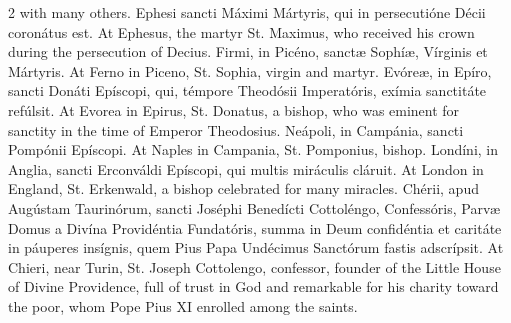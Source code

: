 \begin{paracol}{2}
 with many others.
\switchcolumn*
{}
Ephesi sancti Máximi 
 Mártyris, qui in persecutióne Décii coronátus est.
\switchcolumn
{}
At Ephesus, the martyr St. Maximus, 
 who received his crown during the persecution of Decius.
\switchcolumn*
{}
Firmi, in Picéno, 
 sanctæ Sophíæ, Vírginis et Mártyris.
\switchcolumn
{}
At Ferno in Piceno, St. Sophia, 
 virgin and martyr.
\switchcolumn*
{}
Evóreæ, in Epíro, 
 sancti Donáti Epíscopi, qui, témpore Theodósii Imperatóris, exímia 
 sanctitáte refúlsit.
\switchcolumn
{}
At Evorea in Epirus, St. Donatus, a 
 bishop, who was eminent for sanctity in the time of Emperor Theodosius.
\switchcolumn*
{}
Neápoli, in Campánia, sancti Pompónii Epíscopi.
\switchcolumn
{}
At Naples in Campania, St. 
 Pomponius, bishop.
\switchcolumn*
{}
Londíni, in Anglia, 
 sancti Erconváldi Epíscopi, qui multis miráculis cláruit.
\switchcolumn
{}
At London in England, St. Erkenwald, 
 a bishop celebrated for many miracles.
\switchcolumn*
{}
Chérii, apud Augústam 
 Taurinórum, sancti Joséphi Benedícti Cottoléngo, Confessóris, Parvæ Domus a 
 Divína Providéntia Fundatóris, summa in Deum confidéntia et caritáte in 
 páuperes insígnis, quem Pius Papa Undécimus Sanctórum fastis adscrípsit.
\switchcolumn
{}
At Chieri, near Turin, St. Joseph 
 Cottolengo, confessor, founder of the Little House of Divine Providence, 
 full of trust in God and remarkable for his charity toward the poor, whom 
 Pope Pius XI enrolled among the saints.
\switchcolumn*
{}
\end{paracol}
